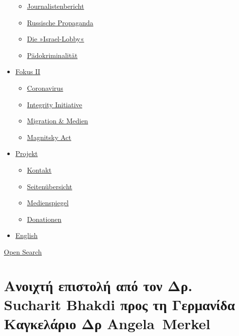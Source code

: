\begin{itemize}
  \begin{itemize}
  \tightlist
  \item
    \href{https://swprs.org/bericht-eines-journalisten/}{Journalistenbericht}
  \item
    \href{https://swprs.org/russische-propaganda/}{Russische Propaganda}
  \item
    \href{https://swprs.org/die-israel-lobby-fakten-und-mythen/}{Die
    »Israel-Lobby«}
  \item
    \href{https://swprs.org/geopolitik-und-paedokriminalitaet/}{Pädokriminalität}
  \end{itemize}
\item
  \href{https://swprs.org/migration-und-medien/}{Fokus II}

  \begin{itemize}
  \tightlist
  \item
    \href{https://swprs.org/covid-19-hinweis-ii/}{Coronavirus}
  \item
    \href{https://swprs.org/die-integrity-initiative/}{Integrity
    Initiative}
  \item
    \href{https://swprs.org/migration-und-medien/}{Migration \& Medien}
  \item
    \href{https://swprs.org/der-fall-magnitsky/}{Magnitsky Act}
  \end{itemize}
\item
  \href{https://swprs.org/kontakt/}{Projekt}

  \begin{itemize}
  \tightlist
  \item
    \href{https://swprs.org/kontakt/}{Kontakt}
  \item
    \href{https://swprs.org/uebersicht/}{Seitenübersicht}
  \item
    \href{https://swprs.org/medienspiegel/}{Medienspiegel}
  \item
    \href{https://swprs.org/donationen/}{Donationen}
  \end{itemize}
\item
  \href{https://swprs.org/contact/}{English}
\end{itemize}

\protect\hyperlink{}{Open Search}

\hypertarget{ux3b1ux3bdux3bfux3b9ux3c7ux3c4ux3ae-ux3b5ux3c0ux3b9ux3c3ux3c4ux3bfux3bbux3ae-ux3b1ux3c0ux3cc-ux3c4ux3bfux3bd-ux3b4ux3c1-sucharit-bhakdi-ux3c0ux3c1ux3bfux3c2-ux3c4ux3b7-ux3b3ux3b5ux3c1ux3bcux3b1ux3bdux3afux3b4ux3b1-ux3baux3b1ux3b3ux3baux3b5ux3bbux3acux3c1ux3b9ux3bf-ux3b4ux3c1-angela-merkel}{%
\section{Ανοιχτή επιστολή από τον Δρ. Sucharit Bhakdi προς τη Γερμανίδα
Καγκελάριο Δρ
Angela~Merkel}\label{ux3b1ux3bdux3bfux3b9ux3c7ux3c4ux3ae-ux3b5ux3c0ux3b9ux3c3ux3c4ux3bfux3bbux3ae-ux3b1ux3c0ux3cc-ux3c4ux3bfux3bd-ux3b4ux3c1-sucharit-bhakdi-ux3c0ux3c1ux3bfux3c2-ux3c4ux3b7-ux3b3ux3b5ux3c1ux3bcux3b1ux3bdux3afux3b4ux3b1-ux3baux3b1ux3b3ux3baux3b5ux3bbux3acux3c1ux3b9ux3bf-ux3b4ux3c1-angela-merkel}}

